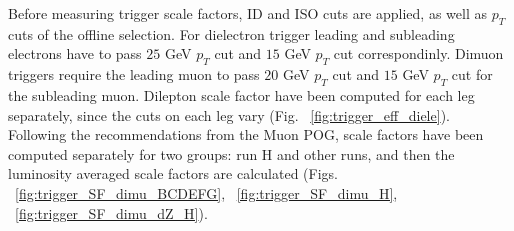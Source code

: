 \begin{table}[b]
\caption{Triggers for dimuon and dielectron analysis channels both at L1 and HLT levels.}

\label{tab:trgs2015}
\begin{center}

\end{center}
\end{table}

Before measuring trigger scale factors, ID and ISO cuts are applied, as well as $p_{T}$ cuts of the offline selection. For dielectron trigger leading and subleading electrons have to pass $25$ GeV $p_{T}$ cut and $15$ GeV $p_{T}$ cut correspondinly. Dimuon triggers require the leading muon to pass $20$ GeV $p_{T}$ cut and $15$ GeV $p_{T}$ cut for the subleading muon. 
Dilepton scale factor have been computed for each leg separately, since the cuts on each leg vary (Fig. ~\ref{fig:trigger_eff_diele}). Following the recommendations from the Muon POG, scale factors have been computed separately for two groups: run H and other runs, and then the luminosity averaged scale factors are calculated (Figs. ~\ref{fig:trigger_SF_dimu_BCDEFG}, ~\ref{fig:trigger_SF_dimu_H}, ~\ref{fig:trigger_SF_dimu_dZ_H}). 

